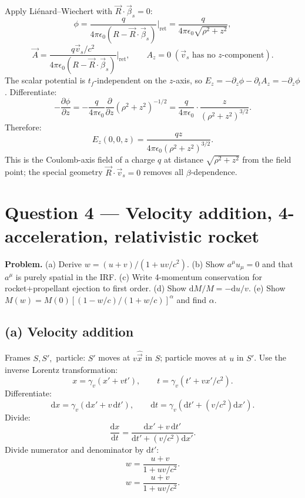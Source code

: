 \documentclass[11pt]{article}
\newcommand{\de}{\mathrm{d}}
\newcommand{\pd}[2]{\frac{\partial #1}{\partial #2}}
\begin{document}
Apply Li{\'e}nard--Wiechert with $\vec R\!\cdot\!\vec\beta_{s}=0$:
\[ \phi=\frac{q}{4\pi\epsilon_{0}(R-\vec R\!\cdot\!\vec\beta_{s})}\bigg|_{\text{ret}}=\frac{q}{4\pi\epsilon_{0}\sqrt{\rho^{2}+z^{2}}}, \]
\[ \vec A=\frac{q\vec v_{s}/c^{2}}{4\pi\epsilon_{0}(R-\vec R\!\cdot\!\vec\beta_{s})}\bigg|_{\text{ret}},\qquad A_{z}=0\;(\vec v_{s}\text{ has no }z\text{-component}). \]
The scalar potential is $t_{f}$-independent on the $z$-axis, so $E_{z}=-\partial_{z}\phi-\partial_{t}A_{z}=-\partial_{z}\phi$. Differentiate:
\[ -\pd{\phi}{z}=-\frac{q}{4\pi\epsilon_{0}}\pd{}{z}(\rho^{2}+z^{2})^{-1/2}=\frac{q}{4\pi\epsilon_{0}}\cdot\frac{z}{(\rho^{2}+z^{2})^{3/2}}. \]
Therefore:
\begin{equation}
\boxed{\;E_{z}(0,0,z)=\frac{qz}{4\pi\epsilon_{0}(\rho^{2}+z^{2})^{3/2}}.\;}
\end{equation}
This is the Coulomb-axis field of a charge $q$ at distance $\sqrt{\rho^{2}+z^{2}}$ from the field point; the special geometry $\vec R\!\cdot\!\vec v_{s}=0$ removes all $\beta$-dependence.

\section*{Question 4 --- Velocity addition, 4-acceleration, relativistic rocket}

\textbf{Problem.} (a) Derive $w=(u+v)/(1+uv/c^{2})$. (b) Show $a^{\mu}u_{\mu}=0$ and that $a^{\mu}$ is purely spatial in the IRF. (c) Write 4-momentum conservation for rocket+propellant ejection to first order. (d) Show $\de M/M=-\de u/v$. (e) Show $M(w)=M(0)[(1-w/c)/(1+w/c)]^{\alpha}$ and find $\alpha$.

\subsection*{(a) Velocity addition}

Frames $S,S',$ particle: $S'$ moves at $v\hat{\vec x}$ in $S$; particle moves at $u$ in $S'$. Use the inverse Lorentz transformation:
\[ x=\gamma_{v}(x'+vt'),\qquad t=\gamma_{v}(t'+vx'/c^{2}). \]
Differentiate:
\[ \de x=\gamma_{v}(\de x'+v\,\de t'),\qquad \de t=\gamma_{v}(\de t'+(v/c^{2})\de x'). \]
Divide:
\[ \frac{\de x}{\de t}=\frac{\de x'+v\,\de t'}{\de t'+(v/c^{2})\de x'}. \]
Divide numerator and denominator by $\de t'$:
\[ w=\frac{u+v}{1+uv/c^{2}}. \]
\begin{equation}
\boxed{\;w=\frac{u+v}{1+uv/c^{2}}.\;}
\end{equation}
\end{document}
